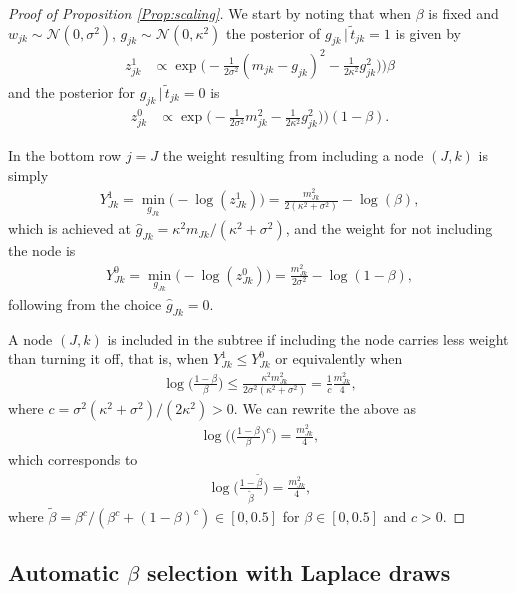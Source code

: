 \documentclass[11pt,a4paper]{article}
\newcommand{\g}{{\, |\,}}
\newcommand{\Nn}{{\mathcal N}}
\begin{document}
\begin{proof}[Proof of Proposition \ref{Prop:scaling}]
We start by noting that when $\beta$ is fixed and $w_{jk}\sim\Nn(0,\sigma^2)$, $g_{jk}\sim\Nn(0,\kappa^2)$ the posterior of $g_{jk}\g \tilde{t}_{jk}=1$ is given by
\begin{align*}
z_{jk}^1 & \propto \exp\Big(-\frac{1}{2\sigma^2}(m_{jk}-g_{jk})^2
-\frac{1}{2\kappa^2}g_{jk}^2)\Big)\beta
\end{align*}
and the posterior for $g_{jk}\g \tilde{t}_{jk}=0$ is 
\begin{align*}
z_{jk}^0 & \propto \exp\Big(-\frac{1}{2\sigma^2}m_{jk}^2-\frac{1}{2\kappa^2}g_{jk}^2)\Big)(1-\beta).
\end{align*}

In the bottom row $j=J$ the weight resulting from including a node $(J,k)$ is simply
\begin{align*}
    Y_{Jk}^1=\min_{g_{Jk}}\Big(-\log(z_{Jk}^1)\Big)
=\frac{m_{Jk}^2}{2(\kappa^2+\sigma^2)}-\log(\beta),
\end{align*}
which is achieved at $\hat{g}_{Jk}=\kappa^2m_{Jk}/(\kappa^2+\sigma^2)$, and the weight for not including the node is 
\begin{align*}
    Y_{Jk}^0=\min_{g_{Jk}}\Big(-\log(z_{Jk}^0)\Big)
=\frac{m_{Jk}^2}{2\sigma^2}-\log(1-\beta),
\end{align*}
following from the choice $\hat{g}_{Jk}=0$.

A node $(J,k)$ is included in the subtree if including the node carries less weight than turning it off, that is, when $Y_{Jk}^1\leq Y_{Jk}^0$ or equivalently when 
\begin{align*}
    \log\Big(\frac{1-\beta}{\beta}\Big)
    \leq \frac{\kappa^2m_{Jk}^2}{2\sigma^2(\kappa^2+\sigma^2)}
    =\frac{1}{c}\frac{m_{Jk}^2}{4},
\end{align*}
where $c=\sigma^2(\kappa^2+\sigma^2)/(2\kappa^2)>0$.  We can rewrite the above as 
\begin{align*}
    \log\Bigg(\Big(\frac{1-\beta}{\beta}\Big)^c\Bigg)
    =\frac{m_{Jk}^2}{4},
\end{align*}
which corresponds to 
\begin{align*}
    \log\Big(\frac{1-\widetilde{\beta}}{\widetilde{\beta}}\Big)
    =\frac{m_{Jk}^2}{4},
\end{align*}
where $\widetilde{\beta}=\beta^c/(\beta^c+(1-\beta)^c)\in[0,0.5]$ for $\beta\in[0,0.5]$ and $c>0$. 
\end{proof}


\subsection{Automatic $\beta$ selection with Laplace draws}\label{Sec:PruningLaplace}
\end{document}
